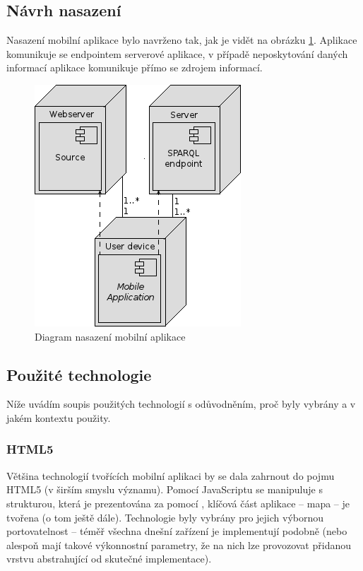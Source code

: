 \subsection{Návrh nasazení}
Nasazení mobilní aplikace bylo navrženo tak, jak je vidět na obrázku \ref{fig:mobile:deployment}. Aplikace komunikuje se  endpointem serverové aplikace, v případě neposkytování daných informací aplikace komunikuje přímo se zdrojem informací.
\begin{figure}[h]
 \centering
 \includegraphics{./figures/deployment-m.png}
 \caption{Diagram nasazení mobilní aplikace}
 \label{fig:mobile:deployment}
\end{figure}


\subsection{Použité technologie}
Níže uvádím soupis použitých technologií s odůvodněním, proč byly vybrány a v jakém kontextu použity.

\subsubsection{HTML5}
Většina technologií tvořících mobilní aplikaci by se dala zahrnout do pojmu HTML5 (v širším smyslu významu). Pomocí JavaScriptu se manipuluje s  strukturou, která je prezentována za pomocí , klíčová část aplikace -- mapa -- je tvořena  (o tom ještě dále). Technologie byly vybrány pro jejich výbornou portovatelnost -- téměř všechna dnešní zařízení je implementují podobně (nebo alespoň mají takové výkonnostní parametry, že na nich lze provozovat přidanou vrstvu abstrahující od skutečné implementace).

